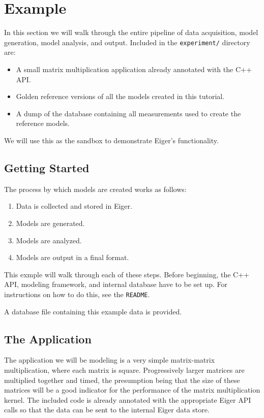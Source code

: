 \section{Example}
\label{sec:example}

In this section we will walk through the entire pipeline of data acquisition, model generation, model analysis, and output. Included in the \texttt{experiment/} directory are:
	\begin{itemize}
	\item A small matrix multiplication application already annotated with the C++ API.
	\item Golden reference versions of all the models created in this tutorial.
	\item A dump of the database containing all measurements used to create the reference models.
	\end{itemize}
	We will use this as the sandbox to demonstrate Eiger's functionality.

\subsection{Getting Started}
The process by which models are created works as follows:
	\begin{enumerate}
	\item Data is collected and stored in Eiger.
	\item Models are generated.
	\item Models are analyzed.
	\item Models are output in a final format.
	\end{enumerate}
This exmple will walk through each of these steps. Before beginning, the C++ API, modeling framework, and internal database have to be set up. For instructions on how to do this, see the \texttt{README}.

A database file containing this example data is provided.

\subsection{The Application}
The application we will be modeling is a very simple matrix-matrix multiplication, where each matrix is square. Progressively larger matrices are multiplied together and timed, the presumption being that the size of these matrices will be a good indicator for the performance of the matrix multiplication kernel. The included code is already annotated with the appropriate Eiger API calls so that the data can be sent to the internal Eiger data store. 

